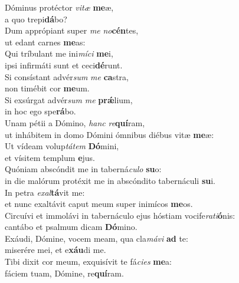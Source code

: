 \evenverse Dóminus protéctor \textit{vi}\textit{tæ} \textbf{me}æ,~\*\\
\evenverse a quo trepi\textbf{dá}bo?\\
\oddverse Dum apprópiant super \textit{me} \textit{no}\textbf{cén}tes,~\*\\
\oddverse ut edant carnes \textbf{me}as:\\
\evenverse Qui tríbulant me ini\textit{mí}\textit{ci} \textbf{me}i,~\*\\
\evenverse ipsi infirmáti sunt et ceci\textbf{dé}runt.\\
\oddverse Si consístant advér\textit{sum} \textit{me} \textbf{ca}stra,~\*\\
\oddverse non timébit cor \textbf{me}um.\\
\evenverse Si exsúrgat advér\textit{sum} \textit{me} \textbf{prǽ}lium,~\*\\
\evenverse in hoc ego spe\textbf{rá}bo.\\
\oddverse Unam pétii a Dómino, \textit{hanc} \textit{re}\textbf{quí}ram,~\*\\
\oddverse ut inhábitem in domo Dómini ómnibus diébus vitæ \textbf{me}æ:\\
\evenverse Ut vídeam volup\textit{tá}\textit{tem} \textbf{Dó}mini,~\*\\
\evenverse et vísitem templum \textbf{e}jus.\\
\oddverse Quóniam abscóndit me in taberná\textit{cu}\textit{lo} \textbf{su}o:~\*\\
\oddverse in die malórum protéxit me in abscóndito tabernáculi \textbf{su}i.\\
\evenverse In petra \textit{e}\textit{xal}\textbf{tá}vit me:~\*\\
\evenverse et nunc exaltávit caput meum super inimícos \textbf{me}os.\\
\oddverse Circuívi et immolávi in tabernáculo ejus hóstiam vocife\textit{ra}\textit{ti}\textbf{ó}nis:~\*\\
\oddverse cantábo et psalmum dicam \textbf{Dó}mino.\\
\evenverse Exáudi, Dómine, vocem meam, qua cla\textit{má}\textit{vi} \textbf{ad} te:~\*\\
\evenverse miserére mei, et e\textbf{xáu}di me.\\
\oddverse Tibi dixit cor meum, exquisívit te fá\textit{ci}\textit{es} \textbf{me}a:~\*\\
\oddverse fáciem tuam, Dómine, re\textbf{quí}ram.\\
